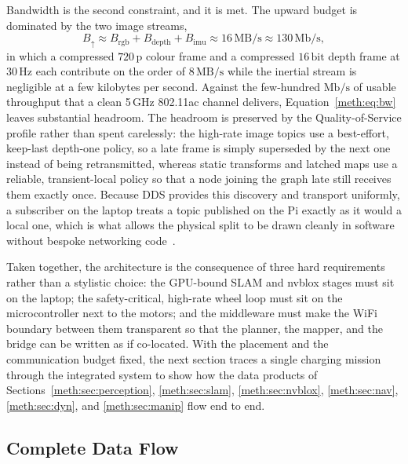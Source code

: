 Bandwidth is the second constraint, and it is met. The upward budget is dominated by the two image streams,
\begin{equation}
B_{\uparrow}
\approx B_{\mathrm{rgb}} + B_{\mathrm{depth}} + B_{\mathrm{imu}}
\approx \ensuremath{16\,\mathrm{MB/s}}
\approx \ensuremath{130\,\mathrm{Mb/s}},
\label{meth:eq:bw}
\end{equation}
in which a compressed \ensuremath{720\,\mathrm{p}} colour frame and a compressed \ensuremath{16\,\mathrm{bit}} depth frame at \ensuremath{30\,\mathrm{Hz}} each contribute on the order of \ensuremath{8\,\mathrm{MB/s}} while the inertial stream is negligible at a few kilobytes per second. Against the few-hundred \ensuremath{\mathrm{Mb/s}} of usable throughput that a clean 5\,\ensuremath{\mathrm{GHz}} 802.11ac channel delivers, Equation~\eqref{meth:eq:bw} leaves substantial headroom. The headroom is preserved by the Quality-of-Service profile rather than spent carelessly: the high-rate image topics use a best-effort, keep-last depth-one policy, so a late frame is simply superseded by the next one instead of being retransmitted, whereas static transforms and latched maps use a reliable, transient-local policy so that a node joining the graph late still receives them exactly once. Because DDS provides this discovery and transport uniformly, a subscriber on the laptop treats a topic published on the Pi exactly as it would a local one, which is what allows the physical split to be drawn cleanly in software without bespoke networking code~\cite{macenski_2022_ros2}.

Taken together, the architecture is the consequence of three hard requirements rather than a stylistic choice: the GPU-bound SLAM and nvblox stages must sit on the laptop; the safety-critical, high-rate wheel loop must sit on the microcontroller next to the motors; and the middleware must make the WiFi boundary between them transparent so that the planner, the mapper, and the bridge can be written as if co-located. With the placement and the communication budget fixed, the next section traces a single charging mission through the integrated system to show how the data products of Sections~\ref{meth:sec:perception}, \ref{meth:sec:slam}, \ref{meth:sec:nvblox}, \ref{meth:sec:nav}, \ref{meth:sec:dyn}, and \ref{meth:sec:manip} flow end to end.

\subsection{Complete Data Flow}\label{meth:sec:dataflow}


